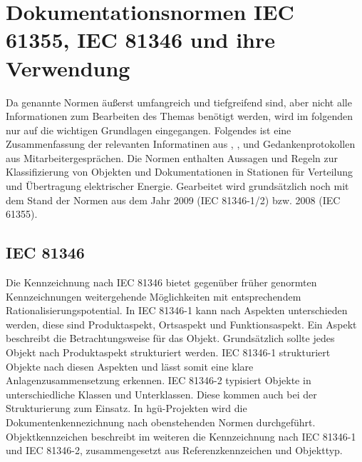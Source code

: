 \section{Dokumentationsnormen IEC 61355, IEC 81346 und ihre Verwendung}
\label{sec:iec}
Da genannte Normen äußerst umfangreich und tiefgreifend sind, aber nicht alle Informationen zum Bearbeiten des Themas benötigt werden, wird im folgenden nur auf die wichtigen Grundlagen eingegangen.
Folgendes ist eine Zusammenfassung der relevanten Informatinen aus \cite[Kapitel 1-5]{3}, \cite[Kapitel 1-5]{4}, \cite[Kapitel 1-4,6]{5} und Gedankenprotokollen aus Mitarbeitergesprächen.
Die Normen enthalten Aussagen und Regeln zur Klassifizierung von Objekten und Dokumentationen in Stationen für Verteilung und Übertragung elektrischer Energie. Gearbeitet wird grundsätzlich noch mit dem Stand der Normen aus dem Jahr 2009 (IEC 81346-1/2) bzw. 2008 (IEC 61355).
\subsection{IEC 81346}
\label{sub:81346}
Die Kennzeichnung nach IEC 81346 bietet gegenüber früher genormten Kennzeichnungen weitergehende Möglichkeiten mit entsprechendem Rationalisierungspotential.
In IEC 81346-1 kann nach Aspekten unterschieden werden, diese sind Produktaspekt, Ortsaspekt und Funktionsaspekt. Ein Aspekt beschreibt die Betrachtungsweise für das Objekt. Grundsätzlich sollte jedes Objekt nach Produktaspekt strukturiert werden. IEC 81346-1 strukturiert Objekte nach diesen Aspekten und lässt somit eine klare Anlagenzusammensetzung erkennen. 
IEC 81346-2 typisiert Objekte in unterschiedliche Klassen und Unterklassen. Diese kommen auch bei der Strukturierung zum Einsatz.
In \ac{hgü}-Projekten wird die Dokumentenkennezichnung nach obenstehenden Normen durchgeführt. Objektkennzeichen beschreibt im weiteren die Kennzeichnung nach IEC 81346-1 und IEC 81346-2, zusammengesetzt aus Referenzkennzeichen und Objekttyp.
\\
\\
